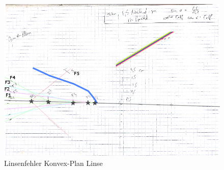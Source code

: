 \documentclass[12pt,a4paper]{article}
\begin{document}
\begin{figure}[H]
	\centering
	\includegraphics[scale=0.45]{./figure/konvex_plan.png}
	\caption{Linsenfehler Konvex-Plan Linse}
	\label{fig:linsenfehler_strahlen_konvex_plan}
\end{figure}
\noindent
\end{document}
